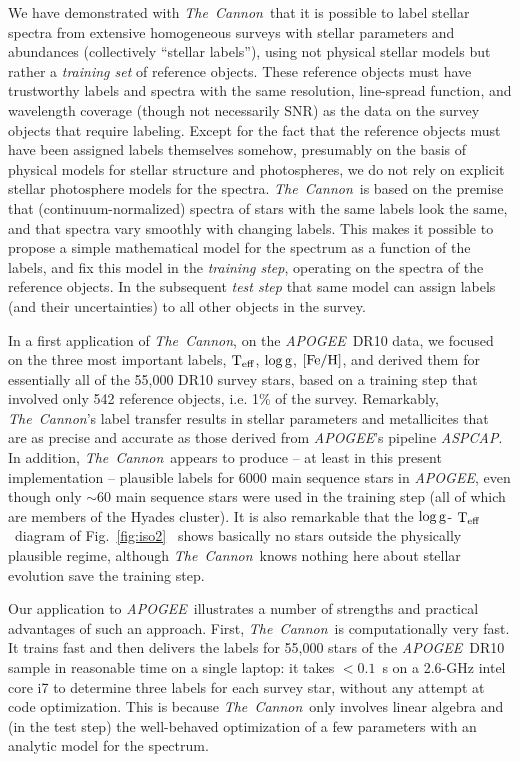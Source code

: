 \documentclass[12pt, preprint]{aastex}
\newcommand{\tc}{\textsl{The~Cannon}}
\newcommand{\apogee}{\textsl{APOGEE}}
\newcommand{\aspcap}{\textsl{ASPCAP}}
\newcommand{\teff}{\mbox{$\rm T_{eff}$}}
\newcommand{\feh}{\mbox{$\rm [Fe/H]$}}
\newcommand{\logg}{\mbox{$\rm \log g$}}
\begin{document}
We have demonstrated with \tc\ that it is possible to label stellar
spectra from extensive homogeneous surveys with stellar parameters 
and abundances (collectively ``stellar labels''), using not physical stellar models but rather a
\emph{training set} of reference objects. These reference objects must have trustworthy
labels and spectra with the same resolution, line-spread function, and
wavelength coverage (though not necessarily SNR) as the data on the 
survey objects that require labeling.
Except for the fact that the reference objects must have been assigned
labels themselves somehow, presumably on the basis of physical models for stellar 
structure and photospheres, we do not rely on explicit stellar photosphere models
for the spectra. \tc\  is based on the premise that (continuum-normalized) spectra of stars with the same labels
look the same, and that spectra vary smoothly with changing labels. 
This makes it possible to propose a simple mathematical model for the spectrum as a function of the
labels, and fix this model in the \textit{training step}, operating on the spectra of the reference objects.
In the subsequent \textit{test step} that same model can assign labels (and their uncertainties) to all
other objects in the survey.

In a first application of \tc, on the \apogee\ DR10 data, we focused on the three most important labels, \teff, \logg, \feh , and 
derived them for essentially all of the 55,000 DR10 survey stars, based on a training step that involved only 542 reference objects, i.e. 1\% of the survey.  Remarkably, \tc 's label transfer results in stellar parameters and metallicites that are as precise and accurate as those derived from
\apogee 's pipeline \aspcap. In addition, \tc\ appears to produce -- at least in this present implementation -- plausible labels for 6000 main sequence stars in \apogee, even though only $\sim 60$ main sequence stars were used in the training step (all of which are members of the Hyades cluster). 
It is also remarkable that  the \logg - \teff\  diagram of Fig.~\ref{fig:iso2}~ shows basically no stars outside
the physically plausible regime, although \tc\ knows nothing here about stellar evolution save the training step.

Our application to \apogee\  illustrates a number of strengths and practical advantages of such an approach. First, \tc\ is computationally very fast. It  trains fast and then delivers the labels for 55,000 stars of the
 \apogee\ DR10 sample in reasonable time on a single laptop: it takes $<0.1$~s on a 2.6-GHz
intel core i7 to determine three labels for each survey star, without any
attempt at code optimization. This is because \tc\  only involves linear algebra and (in the test step) the well-behaved optimization of a few parameters with an analytic model for the spectrum. 
\end{document}
